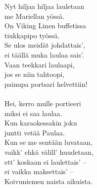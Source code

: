 
            Nyt hiljaa hiljaa lauletaan \\
            me Mariellan yössä. \\
            On Viking Linen buffetissa \\
            tiukkapipo työssä. \\
            Se ulos meidät johdattais', \\
            ei täällä muka laulaa sais'. \\
            Vaan teekkari laulaapi, \\
            jos se niin tahtoopi, \\
            painupa portsari helvettiin! \\
\hspace{10mm} \\
            Hei, kerro mulle portieeri \\
            miksi ei saa laulaa. \\
            Kun karaokessakin joku \\
            juntti vetää Paulaa. \\
            Kun se me sentään luvataan, \\
            vaikk' ehkä välill' huudetaan, \\
            ett' koskaan ei laulettais' – \\
            ei vaikka maksettais' – \\
            Koivuniemen naista aikuista. \\
